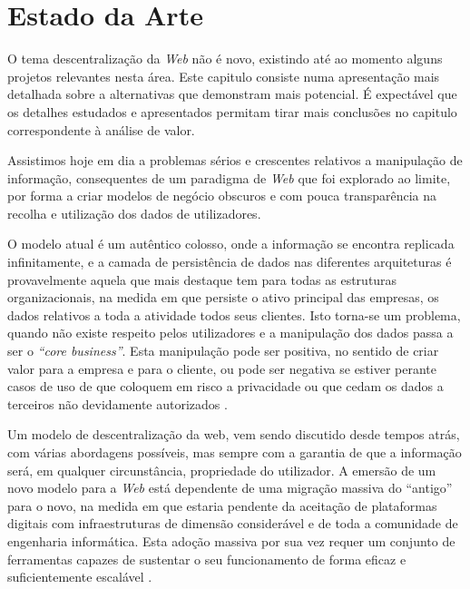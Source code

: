 \chapter{Estado da Arte \label{chapter_estado_arte}}
\label{cap:2}

O tema descentralização da \emph{Web} não é novo, existindo até ao momento alguns projetos relevantes nesta área.
Este capitulo consiste numa apresentação mais detalhada sobre a alternativas que demonstram mais potencial.
É expectável que os detalhes estudados e apresentados permitam tirar mais conclusões no capitulo correspondente à análise de valor.

Assistimos hoje em dia a problemas sérios e crescentes relativos a manipulação de informação, consequentes de um paradigma de \emph{Web} que foi explorado ao limite, por forma a criar modelos de negócio obscuros e com pouca transparência na recolha e utilização dos dados de utilizadores.

O modelo atual é um autêntico colosso, onde a informação se encontra replicada infinitamente, e a camada de persistência de dados nas diferentes arquiteturas é provavelmente aquela que mais destaque tem para todas as estruturas organizacionais, na medida em que persiste o ativo principal das empresas, os dados relativos a toda a atividade todos seus clientes\cite{top_three_issues_centralized_web}. Isto torna-se um problema, quando não existe respeito pelos utilizadores e a manipulação dos dados passa a ser o \emph{“core business”}. Esta manipulação pode ser positiva, no sentido de criar valor para a empresa e para o cliente, ou pode ser negativa se estiver perante casos de uso de que coloquem em risco a privacidade ou que cedam os dados a terceiros não devidamente autorizados \cite{facebook_data_hell_medium}.

Um modelo de descentralização da web, vem sendo discutido desde tempos atrás, com várias abordagens possíveis, mas sempre com a garantia de que a informação será, em qualquer circunstância, propriedade do utilizador\cite{why_web_decentralization_future}.
A emersão de um novo modelo para a \emph{Web} está dependente de uma migração massiva do “antigo” para o novo, na medida em que estaria pendente da aceitação de plataformas digitais com infraestruturas de dimensão considerável e de toda a comunidade de engenharia informática. Esta adoção massiva por sua vez requer um conjunto de ferramentas capazes de sustentar o seu funcionamento de forma eficaz e suficientemente escalável \cite{shift_power_to_users}.

